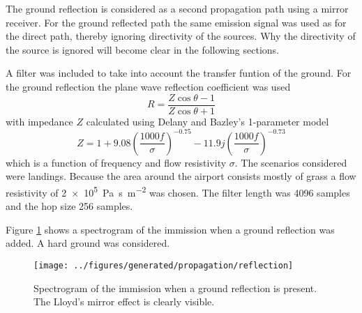 The ground reflection is considered as a second propagation path using a mirror receiver.
For the ground reflected path the same emission signal was used as for the direct path, thereby ignoring directivity of the sources.
Why the directivity of the source is ignored will become clear in the following sections.

A filter was included to take into account the transfer funtion of the ground. For
the ground reflection the plane wave reflection coefficient was used
\begin{equation}
 R = \frac{Z\cos{\theta}-1}{Z\cos{\theta}+1}
\end{equation}
with impedance $Z$ calculated using Delany and Bazley's 1-parameter model
\begin{equation}
 Z = 1 + 9.08 \left( \frac{1000f}{\sigma}\right)^{-0.75} - 11.9 j \left( \frac{1000f}{\sigma}\right)^{-0.73}
\end{equation}
which is a function of frequency and flow resistivity $\sigma$. The scenarios
considered were landings. Because the area around the airport consists mostly of grass a
flow resistivity of \SI{2e5}{\pascal\second\per\meter\squared} was chosen. The
filter length was 4096 samples and the hop size 256 samples.


Figure \ref{fig:implementation:propagation:reflection} shows a spectrogram of
the immission when a ground reflection was added. A hard ground was considered.

\begin{figure}[H]
  \centering
  \texttt{[image: ../figures/generated/propagation/reflection]}
  \caption{Spectrogram of the immission when a ground reflection is present. The Lloyd's mirror effect is clearly visible.}
  \label{fig:implementation:propagation:reflection}
\end{figure}


